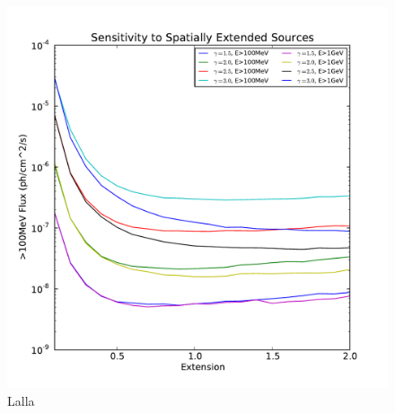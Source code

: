 \documentclass{emulateapj}
\begin{document}
\begin{figure}
  \begin{center}
    \includegraphics{mc_plots/sensitivity.pdf}
    \end{center}
    \caption{Lalla}\label{sensitivity_ext}
  \end{figure}
\end{document}
